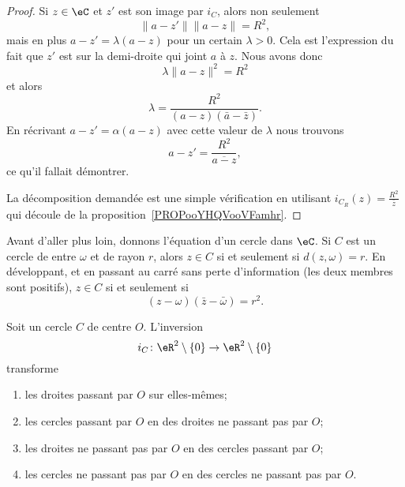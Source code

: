 \begin{proof}
    Si \( z\in \eC\) et \( z'\) est son image par \( i_C\), alors non seulement
    \begin{equation}
        \| a-z' \|\| a-z \|=R^2,
    \end{equation}
    mais en plus \( a-z'=\lambda(a-z)\) pour un certain \( \lambda>0\). Cela est l'expression du fait que \( z'\) est sur la demi-droite qui joint \( a\) à \( z\). Nous avons donc
    \begin{equation}
        \lambda\| a-z \|^2=R^2
    \end{equation}
    et alors
    \begin{equation}
        \lambda=\frac{ R^2 }{ (a-z)(\bar a-\bar z) }.
    \end{equation}
    En récrivant \( a-z'=\alpha(a-z)\) avec cette valeur de \( \lambda\) nous trouvons
    \begin{equation}
        a-z'=\frac{ R^2 }{ \overline{ a-z } },
    \end{equation}
    ce qu'il fallait démontrer.

    La décomposition demandée est une simple vérification en utilisant \( i_{C_R}(z)=\frac{ R^2 }{ \bar z }\) qui découle de la proposition~\ref{PROPooYHQVooVFamhr}.
\end{proof}

Avant d'aller plus loin, donnons l'équation d'un cercle dans \( \eC\). Si \( C\) est un cercle de entre \( \omega\) et de rayon \( r\), alors \( z\in C\) si et seulement si \( d(z,\omega)=r\). En développant, et en passant au carré sans perte d'information (les deux membres sont positifs), \( z\in C\) si et seulement si
\begin{equation}
    (z-\omega)(\bar z-\bar \omega)=r^2.
\end{equation}

\begin{proposition}     \label{PROPooMIMRooTbQRVI}
    Soit un cercle \( C\) de centre \( O\). L'inversion
    \begin{equation}
        i_C\colon \eR^2\setminus\{ 0 \}\to \eR^2\setminus\{ 0 \}
    \end{equation}
    transforme
    \begin{enumerate}
        \item       \label{ITEMooNOXMooQYNPnv}
            les droites passant par \( O\) sur elles-mêmes;
        \item
            les cercles passant par \( O\) en des droites ne passant pas par \( O\);
        \item       \label{ITEMooRFPSooGdJdHD}
            les droites ne passant pas par \( O\) en des cercles passant par \( O\);
        \item
            les cercles ne passant pas par \( O\) en des cercles ne passant pas par \( O\).
    \end{enumerate}
\end{proposition}

